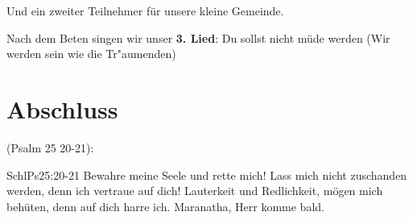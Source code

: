 \documentclass{../inc/mybib}
\begin{document}
Und ein zweiter Teilnehmer für unsere kleine Gemeinde.

Nach dem Beten singen wir unser \textbf{3. Lied}: Du sollst nicht m\"ude werden (Wir werden sein wie die Tr\̈"aumenden)

\section{Abschluss}
(Psalm 25 20-21):
\begin{bibeltext}{Schl}{Ps}{25:20-21}
Bewahre meine Seele und rette mich! Lass mich nicht zuschanden werden, denn ich vertraue auf dich! Lauterkeit und Redlichkeit, mögen mich behüten, denn auf dich harre ich.
Maranatha, Herr komme bald.
\end{bibeltext}
\end{document}

